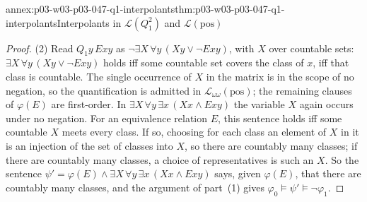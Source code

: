 \begin{annexitem}{annex:p03-w03-p03-047-q1-interpolants}{thm:p03-w03-p03-047-q1-interpolants}{Interpolants in \(\mathscr L(Q_1^2)\) and \(\mathscr L(\mathrm{pos})\)}
\begin{proof}
(2) Read \(Q_1y\,Exy\) as \(\neg\exists X\,\forall y\,(Xy\lor\neg Exy)\), with
\(X\) over countable sets: \(\exists X\,\forall y\,(Xy\lor\neg Exy)\) holds
iff some countable set covers the class of \(x\), iff that class is
countable.  The single occurrence of \(X\) in the matrix is in the scope of
no negation, so the quantification is admitted in
\(\mathscr L_{\omega\omega}(\mathrm{pos})\); the remaining clauses of
\(\varphi(E)\) are first-order.  In \(\exists X\,\forall y\,\exists x\,(Xx\land Exy)\)
the variable \(X\) again occurs under no negation.  For an equivalence
relation \(E\), this sentence holds iff some countable \(X\) meets every
class.  If so, choosing for each class an element of \(X\) in it is an
injection of the set of classes into \(X\), so there are countably many
classes; if there are countably many classes, a choice of representatives is
such an \(X\).  So the sentence \(\psi'=\varphi(E)\land\exists X\,\forall y\,\exists x\,(Xx\land Exy)\)
says, given \(\varphi(E)\), that there are countably many classes, and the
argument of part~(1) gives \(\varphi_0\models\psi'\models\neg\varphi_1\).
\end{proof}
\end{annexitem}

